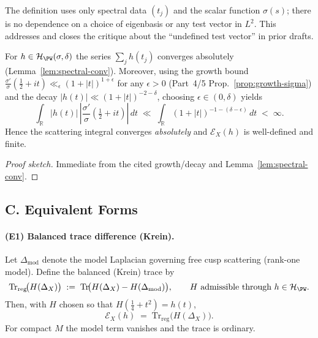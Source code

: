 \begin{remark}
The definition uses only spectral data $(t_j)$ and the scalar function $\sigma(s)$; there is no dependence on a choice of eigenbasis or any test vector in $L^2$. This addresses and closes the critique about the ``undefined test vector'' in prior drafts.
\end{remark}

\begin{lemma}
\label{lem:well-defined}
For $h\in\mathcal H_{\PW}(\sigma,\delta)$ the series $\sum_j h(t_j)$ converges absolutely (Lemma~\ref{lem:spectral-conv}). Moreover, using the growth bound $\frac{\sigma'}{\sigma}(\tfrac12+it)\ll_\epsilon (1+|t|)^{1+\epsilon}$ for any $\epsilon>0$ (Part~4/5 Prop.~\ref{prop:growth-sigma}) and the decay $|h(t)|\ll (1+|t|)^{-2-\delta}$, choosing $\epsilon\in(0,\delta)$ yields
\[
  \int_{\mathbb R} \big|h(t)\big|\,\left|\frac{\sigma'}{\sigma}\!\left(\tfrac12+it\right)\right|\,dt
  \;\ll\; \int_{\mathbb R} (1+|t|)^{-1-(\delta-\epsilon)}\,dt
  \;<\;\infty.
\]
Hence the scattering integral converges \emph{absolutely} and $\mathcal E_X(h)$ is well-defined and finite.
\end{lemma}

\begin{proof}[Proof sketch]
Immediate from the cited growth/decay and Lemma~\ref{lem:spectral-conv}.
\end{proof}


\subsection*{C. Equivalent Forms}
\label{subsec:equiv-forms}

\paragraph{(E1) Balanced trace difference (Krein).}
Let $\Delta_{\mathrm{mod}}$ denote the model Laplacian governing free cusp scattering (rank-one model). Define the balanced (Krein) trace by
\[
  \mathrm{Tr}_{\mathrm{reg}}\!\big(H(\Delta_X)\big)
  \;:=\; \mathrm{Tr}\!\big(H(\Delta_X)-H(\Delta_{\mathrm{mod}})\big),
  \qquad H \text{ admissible through } h\in\mathcal H_{\PW}.
\]
Then, with $H$ chosen so that $H(\tfrac14+t^2)=h(t)$,
\begin{equation}
\label{eq:trace-model}
  \mathcal E_X(h)
  \;=\;
  \mathrm{Tr}_{\mathrm{reg}}\!\big(H(\Delta_X)\big).
\end{equation}
For compact $M$ the model term vanishes and the trace is ordinary.

